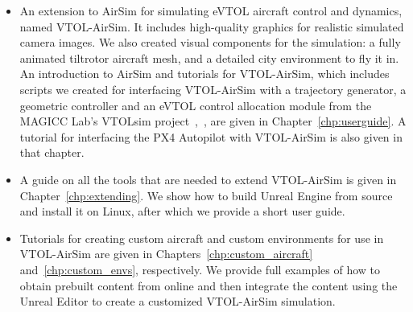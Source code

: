 \begin{itemize}
    \item An extension to AirSim for simulating eVTOL aircraft control and dynamics, named VTOL-AirSim. It includes high-quality graphics for realistic simulated camera images. We also created visual components for the simulation: a fully animated tiltrotor aircraft mesh, and a detailed city environment to fly it in. An introduction to AirSim and tutorials for VTOL-AirSim, which includes scripts we created for interfacing VTOL-AirSim with a trajectory generator, a geometric controller and an eVTOL control allocation module from the MAGICC Lab's VTOLsim project~\cite{Willis2021},~\cite{Willis2022}, are given in Chapter~\ref{chp:userguide}. A tutorial for interfacing the PX4 Autopilot with VTOL-AirSim is also given in that chapter.
    \item A guide on all the tools that are needed to extend VTOL-AirSim is given in Chapter~\ref{chp:extending}. We show how to build Unreal Engine from source and install it on Linux, after which we provide a short user guide.
    \item Tutorials for creating custom aircraft and custom environments for use in VTOL-AirSim are given in Chapters~\ref{chp:custom_aircraft} and~\ref{chp:custom_envs}, respectively. We provide full examples of how to obtain prebuilt content from online and then integrate the content using the Unreal Editor to create a customized VTOL-AirSim simulation.
\end{itemize}


